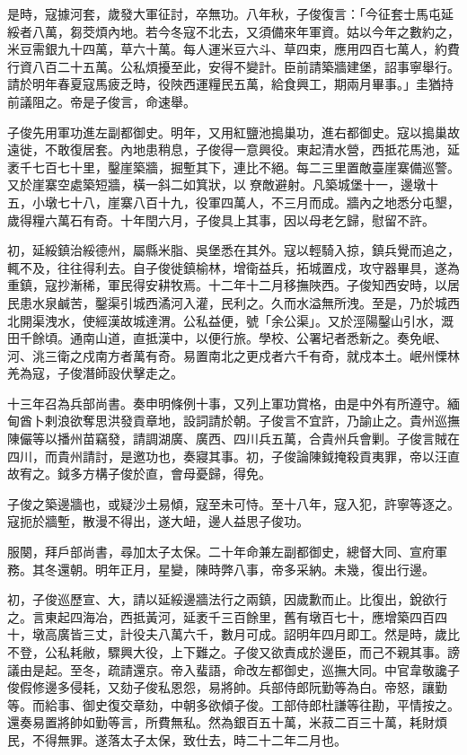 \begin{pinyinscope}
是時，寇據河套，歲發大軍征討，卒無功。八年秋，子俊復言：「今征套士馬屯延綏者八萬，芻茭煩內地。若今冬寇不北去，又須備來年軍資。姑以今年之數約之，米豆需銀九十四萬，草六十萬。每人運米豆六斗、草四束，應用四百七萬人，約費行資八百二十五萬。公私煩擾至此，安得不變計。臣前請築牆建堡，詔事寧舉行。請於明年春夏寇馬疲乏時，役陜西運糧民五萬，給食興工，期兩月畢事。」圭猶持前議阻之。帝是子俊言，命速舉。

子俊先用軍功進左副都御史。明年，又用紅鹽池搗巢功，進右都御史。寇以搗巢故遠徙，不敢復居套。內地患稍息，子俊得一意興役。東起清水營，西抵花馬池，延袤千七百七十里，鑿崖築牆，掘塹其下，連比不絕。每二三里置敵臺崖寨備巡警。又於崖寨空處築短牆，橫一斜二如箕狀，以尞敵避射。凡築城堡十一，邊墩十五，小墩七十八，崖寨八百十九，役軍四萬人，不三月而成。牆內之地悉分屯墾，歲得糧六萬石有奇。十年閏六月，子俊具上其事，因以母老乞歸，慰留不許。

初，延綏鎮治綏德州，屬縣米脂、吳堡悉在其外。寇以輕騎入掠，鎮兵覺而追之，輒不及，往往得利去。自子俊徙鎮榆林，增衛益兵，拓城置戍，攻守器畢具，遂為重鎮，寇抄漸稀，軍民得安耕牧焉。十二年十二月移撫陜西。子俊知西安時，以居民患水泉鹹苦，鑿渠引城西潏河入灌，民利之。久而水溢無所洩。至是，乃於城西北開渠洩水，使經漢故城達渭。公私益便，號「余公渠」。又於涇陽鑿山引水，溉田千餘頃。通南山道，直抵漢中，以便行旅。學校、公署圮者悉新之。奏免岷、河、洮三衛之戍南方者萬有奇。易置南北之更戍者六千有奇，就戍本土。岷州慄林羌為寇，子俊潛師設伏擊走之。

十三年召為兵部尚書。奏申明條例十事，又列上軍功賞格，由是中外有所遵守。緬甸酋卜剌浪欲奪思洪發貢章地，設詞請於朝。子俊言不宜許，乃諭止之。貴州巡撫陳儼等以播州苗竊發，請調湖廣、廣西、四川兵五萬，合貴州兵會剿。子俊言賊在四川，而貴州請討，是邀功也，奏寢其事。初，子俊論陳鉞掩殺貢夷罪，帝以汪直故宥之。鉞多方構子俊於直，會母憂歸，得免。

子俊之築邊牆也，或疑沙土易傾，寇至未可恃。至十八年，寇入犯，許寧等逐之。寇扼於牆塹，散漫不得出，遂大衄，邊人益思子俊功。

服闋，拜戶部尚書，尋加太子太保。二十年命兼左副都御史，總督大同、宣府軍務。其冬還朝。明年正月，星變，陳時弊八事，帝多采納。未幾，復出行邊。

初，子俊巡歷宣、大，請以延綏邊牆法行之兩鎮，因歲歉而止。比復出，銳欲行之。言東起四海冶，西抵黃河，延袤千三百餘里，舊有墩百七十，應增築四百四十，墩高廣皆三丈，計役夫八萬六千，數月可成。詔明年四月即工。然是時，歲比不登，公私耗敝，驟興大役，上下難之。子俊又欲責成於邊臣，而己不親其事。謗議由是起。至冬，疏請還京。帝入蜚語，命改左都御史，巡撫大同。中官韋敬讒子俊假修邊多侵耗，又劾子俊私恩怨，易將帥。兵部侍郎阮勤等為白。帝怒，讓勤等。而給事、御史復交章劾，中朝多欲傾子俊。工部侍郎杜謙等往勘，平情按之。還奏易置將帥如勤等言，所費無私。然為銀百五十萬，米菽二百三十萬，耗財煩民，不得無罪。遂落太子太保，致仕去，時二十二年二月也。


\end{pinyinscope}

